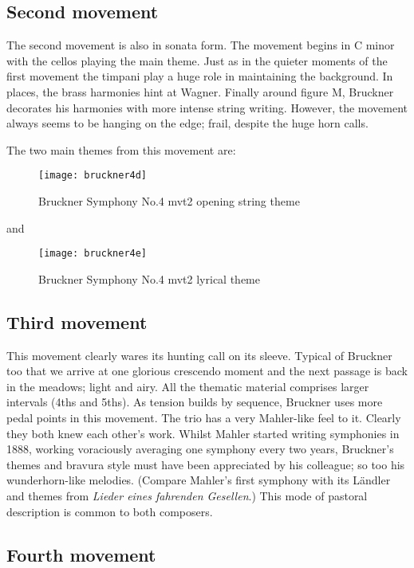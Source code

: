 \subsection{Second movement}

The second movement is also in sonata form. The movement begins in C minor with the cellos playing the main theme. Just as in the quieter moments of the first movement the timpani play a huge role in maintaining the background. In places, the brass harmonies hint at Wagner. Finally around figure M, Bruckner decorates his harmonies with more intense string writing. However, the movement always seems to be hanging on the edge; frail, despite the huge horn calls. 

The two main themes from this movement are: 
\begin{figure}[H]
\centering
\texttt{[image: bruckner4d]}\caption{Bruckner Symphony No.4 mvt2 opening string theme}
\label{fig:bruckner1c}
\end{figure}

and

\begin{figure}[H]
\centering
\texttt{[image: bruckner4e]}\caption{Bruckner Symphony No.4 mvt2 lyrical theme}
\label{fig:bruckner1c}
\end{figure}

\subsection{Third movement}

This movement clearly wares its hunting call on its sleeve. Typical of Bruckner too that we arrive at one glorious crescendo moment and the next passage is back in the meadows; light and airy. All the thematic material comprises larger intervals (4ths and 5ths). As tension builds by sequence, Bruckner uses more pedal points in this movement. The trio has a very Mahler-like feel to it. Clearly they both knew each other's work. Whilst Mahler started writing symphonies in 1888, working voraciously averaging one symphony every two years, Bruckner's themes and bravura style must have been appreciated by his colleague; so too his wunderhorn-like melodies. (Compare Mahler's first symphony with its L\"andler and themes from \textit{Lieder eines fahrenden Gesellen}.) This mode of pastoral description is common to both composers.  

\subsection{Fourth movement}

